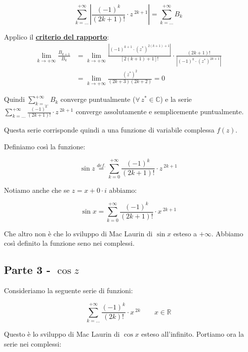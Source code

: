 \documentclass[../dimostrazioni]{subfiles}
\begin{document}
                \[  \sum_{k=\dots}^{+\infty} \left| \frac{(-1)^k}{(2k+1)!} \cdot z\,^{2k+1} \right| = \sum_{k=\dots}^{+\infty} B_k \]

                Applico il \textbf{\hyperref[criterioRapportoSerie]{criterio del rapporto}}:
                \begin{align*}
                    \lim_{k \to +\infty} \frac{B_{k+1}}{B_k} &= \lim_{k \to +\infty} \frac{\left| (-1)^{k+1} \cdot (z^*)^{2(k+1)+1}\right|}{\left[2(k+1)+1\right]!} \cdot \frac{\left(2k+1\right)!}{\left| (-1)^k \cdot (z^*)^{2k+1}\right|} \\
                    &= \lim_{k \to +\infty} \frac{(z^*)^2}{(2k+3)(2k+2)} = 0
                \end{align*}

                Quindi \(\sum_{k=\dots}^{+\infty} B_k\) converge puntualmente (\(\forall \, z^* \in \mathbb{C}\)) 
                e la serie  \(\sum_{k=\dots}^{+\infty} \frac{(-1)^k}{(2k+1)!} \cdot z\,^{2k+1}\) converge assolutamente e semplicemente puntualmente.

                Questa serie corrisponde quindi a una funzione di variabile complessa \(f(z)\).

                Definiamo così la funzione:

                \[  \sin z \stackrel{def.}{=} \sum_{k=0}^{+\infty} \frac{(-1)^k}{(2k+1)!} \cdot z\,^{2k+1}    \]

                Notiamo anche che se \(z = x + 0 \cdot i\) abbiamo:

                \[  \sin x = \sum_{k=0}^{+\infty} \frac{(-1)^k}{(2k+1)!} \cdot x\,^{2k+1} \]

                Che altro non è che lo sviluppo di Mac Laurin di \(\sin x\) esteso a \(+\infty\). 
                Abbiamo così definito la funzione seno nei complessi.

            \subsection*{Parte 3 - \(\cos z\)}

                Consideriamo la seguente serie di funzioni:
            
                \[  \sum_{k=\dots}^{+\infty} \frac{(-1)^k}{(2k)!} \cdot x\,^{2k} \qquad x \in \mathbb{R}  \]

                Questo è lo sviluppo di Mac Laurin di \(\cos x\) esteso all'infinito. Portiamo ora la serie nei complessi:
\end{document}
